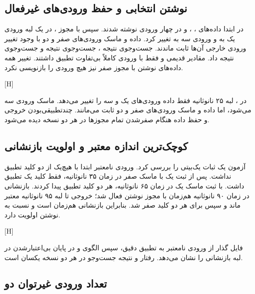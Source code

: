 \subsection{نوشتن انتخابی و حفظ ورودی‌های غیرفعال}

در  ابتدا داده‌های ، ،  و  در چهار ورودی نوشته شدند. سپس با مجوز ، در یک لبه ورودی یک به  و ورودی سه به  تغییر کرد. داده و ماسک ورودی‌های صفر و دو با وجود تغییر ورودی خارجی آن‌ها ثابت ماندند. جست‌وجوی  نتیجه ، جست‌وجوی  نتیجه  و جست‌وجوی  نتیجه  داد. مقادیر قدیمی  و  فقط با ورودی کاملاً بی‌تفاوت تطبیق داشتند. تغییر همه داده‌های نوشتن با مجوز صفر نیز هیچ ورودی را بازنویسی نکرد.

[H]

در ، لبه ۲۵ نانوثانیه فقط داده ورودی‌های یک و سه را تغییر می‌دهد. ماسک ورودی سه  می‌شود، اما داده و ماسک ورودی‌های صفر و دو ثابت می‌مانند. چندتطبیقی‌بودن خروجی و حفظ داده هنگام صفرشدن تمام مجوزها در هر دو نسخه دیده می‌شود.

\subsection{کوچک‌ترین اندازه معتبر و اولویت بازنشانی}

آزمون  یک ثبات یک‌بیتی را بررسی کرد. ورودی نامعتبر ابتدا با هیچ‌یک از دو کلید تطبیق نداشت. پس از ثبت یک با ماسک صفر در زمان ۳۵ نانوثانیه، فقط کلید یک تطبیق داشت. با ثبت ماسک یک در زمان ۶۵ نانوثانیه، هر دو کلید تطبیق پیدا کردند. بازنشانی در زمان ۹۰ نانوثانیه هم‌زمان با مجوز نوشتن فعال شد؛ خروجی تا لبه ۹۵ نانوثانیه معتبر ماند و سپس برای هر دو کلید صفر شد. بنابراین بازنشانی هم‌زمان است و نسبت به نوشتن اولویت دارد.

[H]

فایل  گذار از ورودی نامعتبر به تطبیق دقیق، سپس الگوی  و در پایان بی‌اعتبارشدن در لبه بازنشانی را نشان می‌دهد. رفتار  و نتیجه جست‌وجو در هر دو نسخه یکسان است.

\subsection{تعداد ورودی غیرتوان دو}

